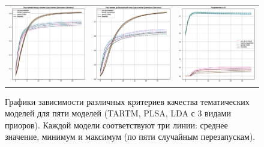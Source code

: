 \begin{figure}
\begin{tabular}{ccc}
    \includegraphics[width=55mm]{images/CH4_vs_regularized_diversity_jensenshannon_False.eps} &   \includegraphics[width=55mm]{images/CH4_vs_regularized_diversity_jensenshannon_True.eps} & \includegraphics[width=55mm]{images/CH4_vs_regularized_SparsityThetaScore.eps} \\
\end{tabular}
    \caption{Графики зависимости различных критериев качества тематических моделей для пяти моделей (TARTM, PLSA, LDA с 3 видами приоров). Каждой модели соответствуют три линии: среднее значение, минимум и максимум (по пяти случайным перезапускам).}
\label{fig:ch4_vs_reg}
\end{figure}


